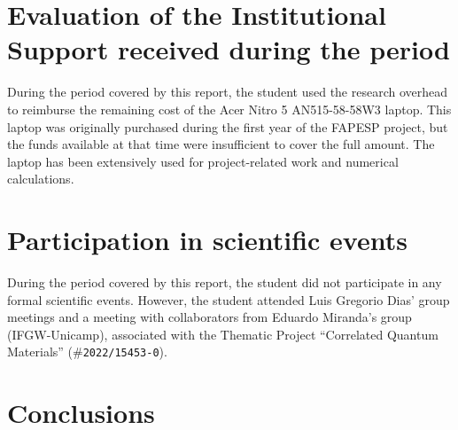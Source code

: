 \documentclass[12pt]{report}
\begin{document}
\chapter{Evaluation of the Institutional Support received during the period} \label{chp:apoioInst}

During the period covered by this report, the student used the research overhead to reimburse the remaining cost of the Acer Nitro 5 AN515-58-58W3 laptop. This laptop was originally purchased during the first year of the FAPESP project, but the funds available at that time were insufficient to cover the full amount. The laptop has been extensively used for project-related work and numerical calculations.



\chapter{Participation in scientific events} \label{chp:particEvento}

During the period covered by this report, the student did not participate in any formal scientific events. However, the student attended Luis Gregorio Dias' group meetings and a meeting with collaborators from Eduardo Miranda's group (IFGW-Unicamp), associated with the Thematic Project ``Correlated Quantum Materials'' (\#\texttt{2022/15453-0}).


\chapter{Conclusions} \label{chp:conclusions}
\end{document}
